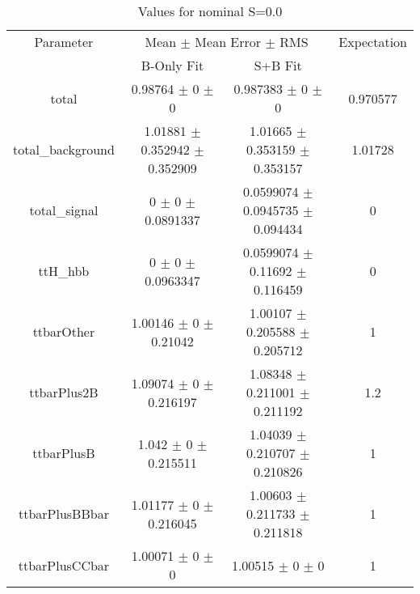 \begin{table}
\centering
\caption{Values for nominal S=0.0}
\begin{tabular}{cccc}
\toprule
Parameter & \multicolumn{2}{c}{Mean $\pm$ Mean Error $\pm$ RMS} & Expectation\\
 & B-Only Fit & S+B Fit & \\
\midrule
total & \num{0.98764} $\pm$ \num{0} $\pm$ \num{0} & \num{0.987383} $\pm$ \num{0} $\pm$ \num{0} & \num{0.970577}\\
total\_background & \num{1.01881} $\pm$ \num{0.352942} $\pm$ \num{0.352909} & \num{1.01665} $\pm$ \num{0.353159} $\pm$ \num{0.353157} & \num{1.01728}\\
total\_signal & \num{0} $\pm$ \num{0} $\pm$ \num{0.0891337} & \num{0.0599074} $\pm$ \num{0.0945735} $\pm$ \num{0.094434} & \num{0}\\
ttH\_hbb & \num{0} $\pm$ \num{0} $\pm$ \num{0.0963347} & \num{0.0599074} $\pm$ \num{0.11692} $\pm$ \num{0.116459} & \num{0}\\
ttbarOther & \num{1.00146} $\pm$ \num{0} $\pm$ \num{0.21042} & \num{1.00107} $\pm$ \num{0.205588} $\pm$ \num{0.205712} & \num{1}\\
ttbarPlus2B & \num{1.09074} $\pm$ \num{0} $\pm$ \num{0.216197} & \num{1.08348} $\pm$ \num{0.211001} $\pm$ \num{0.211192} & \num{1.2}\\
ttbarPlusB & \num{1.042} $\pm$ \num{0} $\pm$ \num{0.215511} & \num{1.04039} $\pm$ \num{0.210707} $\pm$ \num{0.210826} & \num{1}\\
ttbarPlusBBbar & \num{1.01177} $\pm$ \num{0} $\pm$ \num{0.216045} & \num{1.00603} $\pm$ \num{0.211733} $\pm$ \num{0.211818} & \num{1}\\
ttbarPlusCCbar & \num{1.00071} $\pm$ \num{0} $\pm$ \num{0} & \num{1.00515} $\pm$ \num{0} $\pm$ \num{0} & \num{1}\\
\bottomrule
\end{tabular}
\end{table}